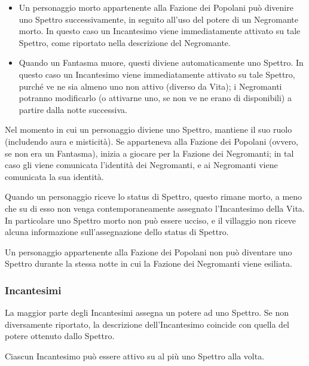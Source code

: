 \documentclass[a4paper,10pt]{article}
\begin{document}
\begin{itemize}
\begin{itemize}
		\item Un personaggio morto appartenente alla Fazione dei Popolani può divenire uno Spettro successivamente, in seguito all'uso del potere di un Negromante morto. In questo caso un Incantesimo viene immediatamente attivato su tale Spettro, come riportato nella descrizione del Negromante.
		
		\item Quando un Fantasma muore, questi diviene automaticamente uno Spettro. In questo caso un Incantesimo viene immediatamente attivato su tale Spettro, purché ve ne sia almeno uno non attivo (diverso da Vita); i Negromanti potranno modificarlo (o attivarne uno, se non ve ne erano di disponibili) a partire dalla notte successiva.
	\end{itemize}
 	
 	Nel momento in cui un personaggio diviene uno Spettro, mantiene il suo ruolo (includendo aura e misticità). Se apparteneva alla Fazione dei Popolani (ovvero, se non era un Fantasma), inizia a giocare per la Fazione dei Negromanti; in tal caso gli viene comunicata l'identità dei Negromanti, e ai Negromanti viene comunicata la sua identità.
 	
	Quando un personaggio riceve lo status di Spettro, questo rimane morto, a meno che su di esso non venga contemporaneamente assegnato l'Incantesimo della Vita.
	In particolare uno Spettro morto non può essere ucciso, e il villaggio non riceve alcuna informazione sull'assegnazione dello status di Spettro.
	
	Un personaggio appartenente alla Fazione dei Popolani non può diventare uno Spettro durante la stessa notte in cui la Fazione dei Negromanti viene esiliata.
	
\end{itemize}


\subsubsection*{Incantesimi}

La maggior parte degli Incantesimi assegna un potere ad uno Spettro. Se non diversamente riportato, la descrizione dell'Incantesimo coincide con quella del potere ottenuto dallo Spettro.

Ciascun Incantesimo può essere attivo su al più uno Spettro alla volta.
\end{document}

